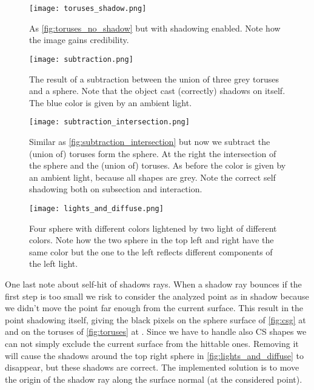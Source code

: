 \begin{figure}[!htb]
  \centering
  \texttt{[image: toruses\_shadow.png]}
  \caption{As \autoref{fig:toruses_no_shadow} but with shadowing enabled. Note how the image gains credibility.}
  \label{fig:toruses_shadow}
\end{figure}

\clearpage

\begin{figure}[!htb]
  \centering
  \texttt{[image: subtraction.png]}
  \caption{The result of a subtraction between the union of three grey toruses and a sphere.
    Note that the object cast (correctly) shadows on itself.
    The blue color is given by an ambient light.
  }
  \label{fig:subtraction}
\end{figure}


\begin{figure}[!htb]
  \centering
  \texttt{[image: subtraction\_intersection.png]}
  \caption{
    Similar as \autoref{fig:subtraction_intersection} but now we subtract the (union of) toruses form the sphere.
    At the right the intersection of the sphere and the (union of) toruses.
    As before the color is given by an ambient light, because all shapes are grey.
    Note the correct self shadowing both on subsection and interaction.
  }
  \label{fig:subtraction_intersection}
\end{figure}

\clearpage
\begin{figure}[!htb]
  \centering
  \texttt{[image: lights\_and\_diffuse.png]}
  \caption{
    Four sphere with different colors lightened by two light of different colors.
    Note how the two sphere in the top left and right have the same color but the one to the left reflects different components of the left light.
  }
  \label{fig:lights_and_diffuse}
\end{figure}

One last note about self-hit of shadows rays.
When a shadow ray bounces if the first step is too small we risk to consider the analyzed point as in shadow because we didn't move the point far enough from the current surface.
This result in the point shadowing itself, giving the black pixels on the sphere surface of \autoref{fig:csg} at  and on the toruses of \autoref{fig:toruses} at .
Since we have to handle also CS shapes we can not simply exclude the current surface from the hittable ones.
Removing it will cause the shadows around the top right sphere in \autoref{fig:lights_and_diffuse} to disappear, but these shadows are correct.
The implemented solution is to move the origin of the shadow ray along the surface normal (at the considered point).
